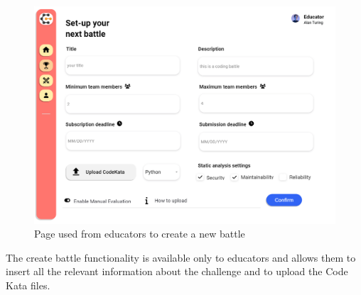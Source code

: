 \begin{figure}[H]
    \centering
    \includegraphics[width=1\textwidth]{Mockups/10_educator_create_battle.png}
    \caption{Page used from educators to create a new battle}
\end{figure}
\newpage
\hfill \break
The create battle functionality is available only to educators and allows them to insert all the relevant information about the challenge and to upload the Code Kata files. \\ \\ \\ \\ \\ \\

